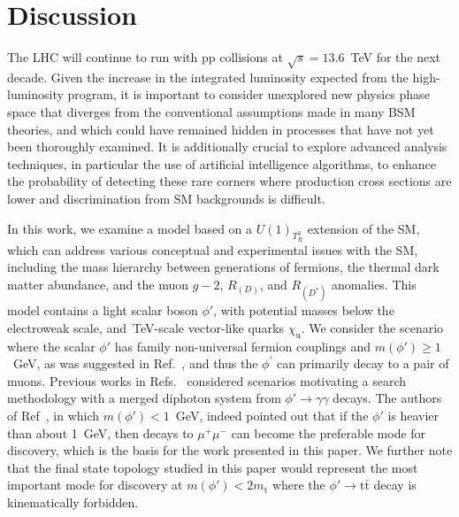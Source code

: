 \section{Discussion}\label{sec:discussion}

The LHC will continue to run with pp collisions at $\sqrt{s} = 13.6$~\textrm{TeV} for the next decade. Given the increase in the integrated luminosity expected from the high-luminosity program, it is important to consider unexplored new physics phase space that diverges from the conventional assumptions made in many BSM theories, and which could have remained hidden in processes that have not yet been thoroughly examined. It is additionally crucial to explore advanced analysis techniques, in particular the use of artificial intelligence algorithms, to enhance the probability of detecting these rare corners where production cross sections are lower and discrimination from SM backgrounds is difficult. 

In this work, we examine a model based on a $U(1)_{T^3_R}$ extension of the SM, which can address various conceptual and experimental issues with the SM, including the mass hierarchy between generations of fermions, the thermal dark matter abundance, and the muon $g - 2$, $R_{(D)}$, and $R_{(D^*)}$ anomalies. This model contains a light scalar boson $\phi'$, with potential masses below the electroweak scale, and~\textrm{TeV}-scale vector-like quarks $\chi_\mathrm{u}$. We consider the scenario where the scalar $\phi'$ has family non-universal fermion couplings and $m(\phi') \ge 1$~\textrm{GeV}, as was suggested in Ref.~\cite{Dutta2020}, and thus the $\phi^{\prime}$ can primarily decay to a pair of muons. Previous works in Refs.~\cite{Dutta2023, Banerjee_2016} considered scenarios motivating a search methodology with a merged diphoton system from $\phi' \to \gamma\gamma$ decays. The authors of Ref~\cite{Dutta2023}, in which $m(\phi') < 1$~\textrm{GeV},  indeed pointed out that if the $\phi'$ is heavier than about 1~\textrm{GeV}, then decays to $\mu^+ \mu^-$ can become the preferable mode for discovery, which is the basis for the work presented in this paper. We further note that the final state topology studied in this paper would represent the most important mode for discovery at $m(\phi') < 2 m_{\mathrm{t}}$ where the $\phi' \to \mathrm{t\bar{t}}$ decay is kinematically forbidden. 

